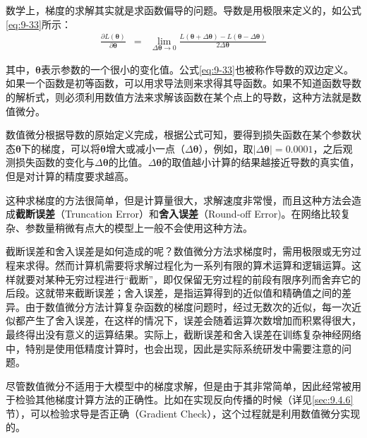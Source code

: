\parinterval 数学上，梯度的求解其实就是求函数偏导的问题。导数是用极限来定义的，如公式\eqref{eq:9-33}所示：
\begin{eqnarray}
\frac{\partial L({\bm \theta})}{\partial {\bm \theta}}&=&\lim\limits_{\Delta {\bm \theta} \to 0}\frac{L({\bm \theta}+\Delta {\bm \theta})-L({\bm \theta}-\Delta {\bm \theta})}{2\Delta {\bm \theta}}
\label{eq:9-33}
\end{eqnarray}

\noindent 其中，${\bm \theta}$表示参数的一个很小的变化值。公式\eqref{eq:9-33}也被称作导数的双边定义。如果一个函数是初等函数，可以用求导法则来求得其导函数。如果不知道函数导数的解析式，则必须利用数值方法来求解该函数在某个点上的导数，这种方法就是数值微分。

\parinterval 数值微分根据导数的原始定义完成，根据公式可知，要得到损失函数在某个参数状态$ {\bm \theta} $下的梯度，可以将$ {\bm \theta} $增大或减小一点（$ \Delta{\bm \theta}$），例如，取$ \vert{\Delta {\bm \theta}}\vert=0.0001 $，之后观测损失函数的变化与$ \Delta {\bm \theta} $的比值。$ \Delta {\bm \theta}$的取值越小计算的结果越接近导数的真实值，但是对计算的精度要求越高。

\parinterval 这种求梯度的方法很简单，但是计算量很大，求解速度非常慢，而且这种方法会造成{\small\sffamily\bfseries{截断误差}}（Truncation Error）和{\small\sffamily\bfseries{舍入误差}}（Round-off Error)。在网络比较复杂、参数量稍微有点大的模型上一般不会使用这种方法。

\parinterval 截断误差和舍入误差是如何造成的呢？数值微分方法求梯度时，需用极限或无穷过程来求得。然而计算机需要将求解过程化为一系列有限的算术运算和逻辑运算。这样就要对某种无穷过程进行“截断”，即仅保留无穷过程的前段有限序列而舍弃它的后段。这就带来截断误差；舍入误差，是指运算得到的近似值和精确值之间的差异。由于数值微分方法计算复杂函数的梯度问题时，经过无数次的近似，每一次近似都产生了舍入误差，在这样的情况下，误差会随着运算次数增加而积累得很大，最终得出没有意义的运算结果。实际上，截断误差和舍入误差在训练复杂神经网络中，特别是使用低精度计算时，也会出现，因此是实际系统研发中需要注意的问题。

\parinterval 尽管数值微分不适用于大模型中的梯度求解，但是由于其非常简单，因此经常被用于检验其他梯度计算方法的正确性。比如在实现反向传播的时候（详见\ref{sec:9.4.6}节），可以检验求导是否正确（Gradient Check），这个过程就是利用数值微分实现的。

%

